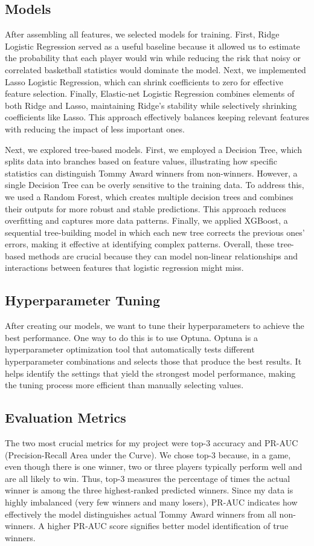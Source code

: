 \documentclass[11pt]{article}
\begin{document}
\subsection{Models}
After assembling all features, we selected models for training. First, Ridge Logistic Regression served as a useful baseline because it allowed us to estimate the probability that each player would win while reducing the risk that noisy or correlated basketball statistics would dominate the model. Next, we implemented Lasso Logistic Regression, which can shrink coefficients to zero for effective feature selection. Finally, Elastic-net Logistic Regression combines elements of both Ridge and Lasso, maintaining Ridge's stability while selectively shrinking coefficients like Lasso. This approach effectively balances keeping relevant features with reducing the impact of less important ones.

Next, we explored tree-based models. First, we employed a Decision Tree, which splits data into branches based on feature values, illustrating how specific statistics can distinguish Tommy Award winners from non-winners. However, a single Decision Tree can be overly sensitive to the training data. To address this, we used a Random Forest, which creates multiple decision trees and combines their outputs for more robust and stable predictions. This approach reduces overfitting and captures more data patterns. Finally, we applied XGBoost, a sequential tree-building model in which each new tree corrects the previous ones' errors, making it effective at identifying complex patterns. Overall, these tree-based methods are crucial because they can model non-linear relationships and interactions between features that logistic regression might miss.

\subsection{Hyperparameter Tuning}
After creating our models, we want to tune their hyperparameters to achieve the best performance. One way to do this is to use Optuna. Optuna is a hyperparameter optimization tool that automatically tests different hyperparameter combinations and selects those that produce the best results. It helps identify the settings that yield the strongest model performance, making the tuning process more efficient than manually selecting values.

\subsection{Evaluation Metrics}
The two most crucial metrics for my project were top-3 accuracy and PR-AUC (Precision-Recall Area under the Curve). We chose top-3 because, in a game, even though there is one winner, two or three players typically perform well and are all likely to win. Thus, top-3 measures the percentage of times the actual winner is among the three highest-ranked predicted winners. Since my data is highly imbalanced (very few winners and many losers), PR-AUC indicates how effectively the model distinguishes actual Tommy Award winners from all non-winners. A higher PR-AUC score signifies better model identification of true winners.
\end{document}
